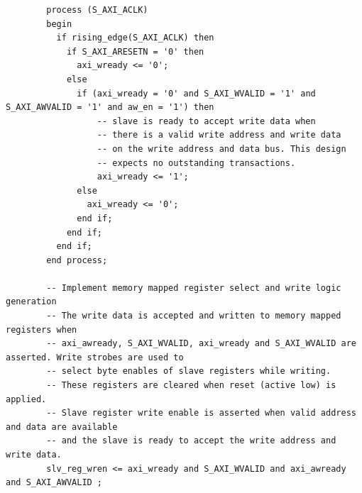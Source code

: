 \begin{verbatim}
        process (S_AXI_ACLK)
        begin
          if rising_edge(S_AXI_ACLK) then 
            if S_AXI_ARESETN = '0' then
              axi_wready <= '0';
            else
              if (axi_wready = '0' and S_AXI_WVALID = '1' and S_AXI_AWVALID = '1' and aw_en = '1') then
                  -- slave is ready to accept write data when 
                  -- there is a valid write address and write data
                  -- on the write address and data bus. This design 
                  -- expects no outstanding transactions.           
                  axi_wready <= '1';
              else
                axi_wready <= '0';
              end if;
            end if;
          end if;
        end process; 
    
        -- Implement memory mapped register select and write logic generation
        -- The write data is accepted and written to memory mapped registers when
        -- axi_awready, S_AXI_WVALID, axi_wready and S_AXI_WVALID are asserted. Write strobes are used to
        -- select byte enables of slave registers while writing.
        -- These registers are cleared when reset (active low) is applied.
        -- Slave register write enable is asserted when valid address and data are available
        -- and the slave is ready to accept the write address and write data.
        slv_reg_wren <= axi_wready and S_AXI_WVALID and axi_awready and S_AXI_AWVALID ;
    

\end{verbatim}
